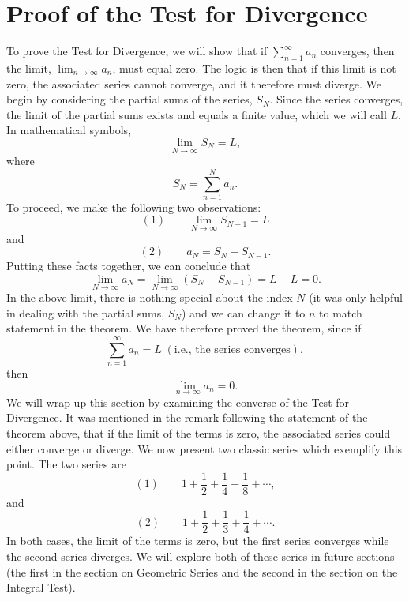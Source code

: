 \documentclass{ximera}
\begin{document}
\section{Proof of the Test for Divergence}
To prove the Test for Divergence, we will show that if $\displaystyle{\sum_{n=1}^\infty a_n}$ converges, then the limit, 
$\displaystyle{\lim_{n \to \infty} a_n}$, must equal zero. The logic is then that if this limit is not zero, 
the associated series cannot converge, and it therefore must diverge. We begin by considering the partial sums of the series, $S_N$.
Since the series converges, the limit of the partial sums exists and equals a finite value, which we will call $L$.
In mathematical symbols, 
\[
\lim_{N \to \infty} S_N = L, 
\]
where
\[
S_N = \sum_{n=1}^N a_n.
\]
To proceed, we make the following two observations:
\[
(1)\qquad \lim_{N \to \infty} S_{N-1} = L
\]
and 
\[
(2) \qquad a_N = S_N - S_{N-1}.
\]
Putting these facts together, we can conclude that
\[
\lim_{N \to \infty} a_N = \lim_{N \to \infty} (S_N - S_{N-1}) = L-L = 0.
\]
In the above limit, there is nothing special about the index $N$ (it was only helpful in dealing with the partial sums, $S_N$) 
and we can change it to $n$ to match statement in the theorem. We have therefore proved the theorem, since if 
\[
\sum_{n=1}^\infty a_n = L \; (\text{i.e., the series converges}),
\]
then 
\[
\lim_{n \to \infty} a_n = 0.
\]
We will wrap up this section by examining the converse of the Test for Divergence.
It was mentioned in the remark following the statement of the theorem above, that if the limit of the terms is zero,
the associated series could either converge or diverge.
We now present two classic series which exemplify this point.
The two series are
\[
(1)  \qquad 1 + \frac12 + \frac14 + \frac18 + \cdots,
\]
and 
\[
(2) \qquad 1 + \frac12 +  \frac13 + \frac14 + \cdots.
\]
In both cases, the limit of the terms is zero, but the first series converges while the second series diverges.
We will explore both of these series in future sections 
(the first in the section on Geometric Series and the second in the section on the Integral Test).





\begin{center}
\begin{foldable}
\end{foldable}
\end{center}
\end{document}
